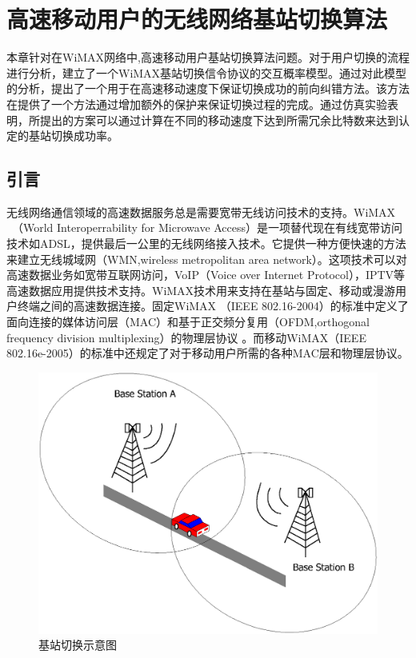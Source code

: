 \graphicspath{ {../body/handover_figures/}}
\chapter{高速移动用户的无线网络基站切换算法}
\label{chap_iccs_handover_alogrithm}
本章针对在WiMAX网络中,高速移动用户基站切换算法问题。对于用户切换的流程进行分析，建立了一个WiMAX基站切换信令协议的交互概率模型。通过对此模型的分析，提出了一个用于在高速移动速度下保证切换成功的前向纠错方法。该方法在提供了一个方法通过增加额外的保护来保证切换过程的完成。通过仿真实验表明，所提出的方案可以通过计算在不同的移动速度下达到所需冗余比特数来达到认定的基站切换成功率。

\section{引言}
\label{section_iccs_handover_algorithm_introduction}
无线网络通信领域的高速数据服务总是需要宽带无线访问技术的支持。WiMAX ~（World Interoperrability for Microwave Access）是一项替代现在有线宽带访问技术如ADSL，提供最后一公里的无线网络接入技术。它提供一种方便快速的方法来建立无线城域网（WMN,wireless metropolitan area network）。这项技术可以对高速数据业务如宽带互联网访问，VoIP（Voice over Internet Protocol），IPTV等高速数据应用提供技术支持。WiMAX技术用来支持在基站与固定、移动或漫游用户终端之间的高速数据连接。固定WiMAX （IEEE 802.16-2004）的标准中定义了面向连接的媒体访问层（MAC）和基于正交频分复用（OFDM,orthogonal frequency division multiplexing）的物理层协议 \cite{IEEE:802_16D:2005}。而移动WiMAX（IEEE 802.16e-2005）的标准中还规定了对于移动用户所需的各种MAC层和物理层协议\cite{IEEE:802_16E:2006}。

\begin{figure}[htbp]
\begin{centering}
\includegraphics[scale=0.7]{../figures/iccs_handover_bs}
\caption{基站切换示意图}
\label{fig:chap_iccs_handover_bs}
\end{centering}
\end{figure}

